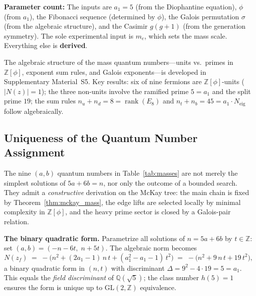 \documentclass[12pt,a4paper]{article}
\theoremstyle{definition}
\begin{document}
\textbf{Parameter count:} The inputs are $a_1 = 5$ (from the Diophantine equation), $\phi$ (from $a_1$), the Fibonacci sequence (determined by $\phi$), the Galois permutation $\sigma$ (from the algebraic structure), and the Casimir $g(g+1)$ (from the generation symmetry). The sole experimental input is $m_e$, which sets the mass scale. Everything else is \textbf{derived}.

The algebraic structure of the mass quantum numbers---units vs.\ primes in $\mathbb{Z}[\phi]$, exponent sum rules, and Galois exponents---is developed in Supplementary Material~S5.  Key results: six of nine fermions are $\mathbb{Z}[\phi]$-units ($|N(z)| = 1$); the three non-units involve the ramified prime $5 = a_1$ and the split prime $19$; the sum rules $n_u + n_d = 8 = \operatorname{rank}(E_8)$ and $n_t + n_b = 45 = a_1 \cdot N_{\text{eig}}$ follow algebraically.

\subsection{Uniqueness of the Quantum Number Assignment}
\label{sec:uniqueness}

The nine $(a,b)$ quantum numbers in Table~\ref{tab:masses} are not merely the simplest solutions of $5a + 6b = n$, nor only the outcome of a bounded search.  They admit a \emph{constructive} derivation on the McKay tree: the main chain is fixed by Theorem~\ref{thm:mckay_mass}, the edge lifts are selected locally by minimal complexity in $\mathbb{Z}[\phi]$, and the heavy prime sector is closed by a Galois-pair relation.

\smallskip\noindent\textbf{The binary quadratic form.}
Parametrize all solutions of $n = 5a + 6b$ by $t \in \mathbb{Z}$: set $(a,b) = (-n - 6t,\; n + 5t)$.
The algebraic norm becomes
\begin{equation}
N(z_f) \;=\; -\bigl(n^2 + (2a_1 - 1)\,n\,t + (a_1^2 - a_1 - 1)\,t^2\bigr)
\;=\; -\bigl(n^2 + 9\,n\,t + 19\,t^2\bigr),
\label{eq:norm_quadratic}
\end{equation}
a binary quadratic form in $(n,t)$ with discriminant $\Delta = 9^2 - 4 \cdot 19 = 5 = a_1$.
This equals the \emph{field discriminant} of $\mathbb{Q}(\sqrt{5})$; the class number $h(5) = 1$ ensures the form is unique up to $\mathrm{GL}(2,\mathbb{Z})$ equivalence.
\end{document}
